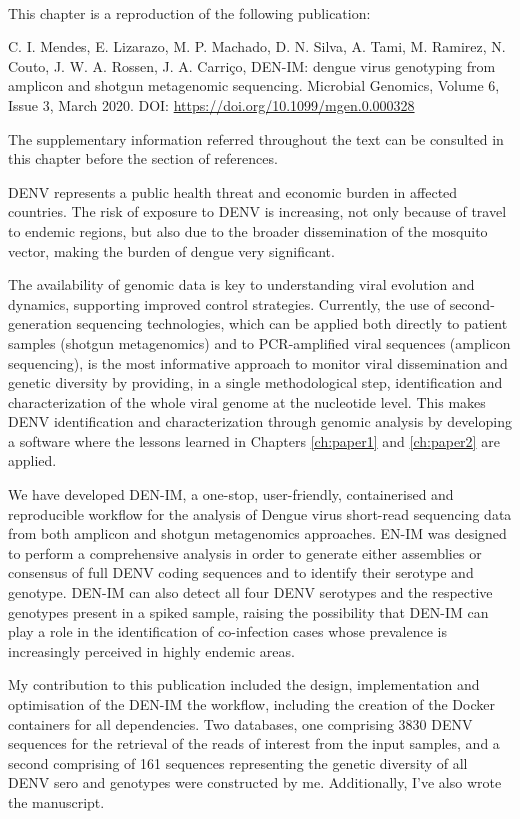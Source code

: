 \mbox{}\\
\vspace{8cm}

This chapter is a reproduction of the following publication:

C. I. Mendes, E. Lizarazo, M. P. Machado, D. N. Silva, A. Tami, M. Ramirez, N. Couto, J. W. A. Rossen, J. A. Carriço, DEN-IM: dengue virus genotyping from amplicon and shotgun metagenomic sequencing. Microbial Genomics, Volume 6, Issue 3, March 2020. DOI: \url{https://doi.org/10.1099/mgen.0.000328}

The supplementary information referred throughout the text can be consulted in this chapter before the section of references. 

\ac{DENV} represents a public health threat and economic burden in affected countries. The risk of exposure to \ac{DENV} is increasing, not only because of travel to endemic regions, but also due to the broader dissemination of the mosquito vector, making the burden of dengue very significant. 

The availability of genomic data is key to understanding viral evolution and dynamics, supporting improved control strategies. Currently, the use of second-generation sequencing technologies, which can be applied both directly to patient samples (shotgun metagenomics) and to PCR-amplified viral sequences (amplicon sequencing), is the most informative approach to monitor viral dissemination and genetic diversity by providing, in a single methodological step, identification and characterization of the whole viral genome at the nucleotide level. This makes \ac{DENV} identification and characterization through genomic analysis by developing a software where the lessons learned in Chapters \ref{ch:paper1} and \ref{ch:paper2} are applied.

We have developed DEN-IM, a one-stop, user-friendly, containerised and reproducible workflow for the analysis of Dengue virus short-read sequencing data from both amplicon and shotgun metagenomics approaches. EN-IM was designed to perform a comprehensive analysis in order to generate either assemblies or consensus of full DENV coding sequences and to identify their serotype and genotype. DEN-IM can also detect all four DENV serotypes and the respective genotypes present in a spiked sample, raising the possibility that DEN-IM can play a role in the identification of co-infection cases whose prevalence is increasingly perceived in highly endemic areas. 

My contribution to this publication included the design, implementation and optimisation of the DEN-IM the workflow, including the creation of  the Docker containers for all dependencies. Two databases, one comprising 3830 \ac{DENV} sequences for the retrieval of the reads of interest from the input samples, and a second comprising of 161 sequences representing the genetic diversity of all \ac{DENV} sero and genotypes were constructed by me.  Additionally, I've also wrote the manuscript.


